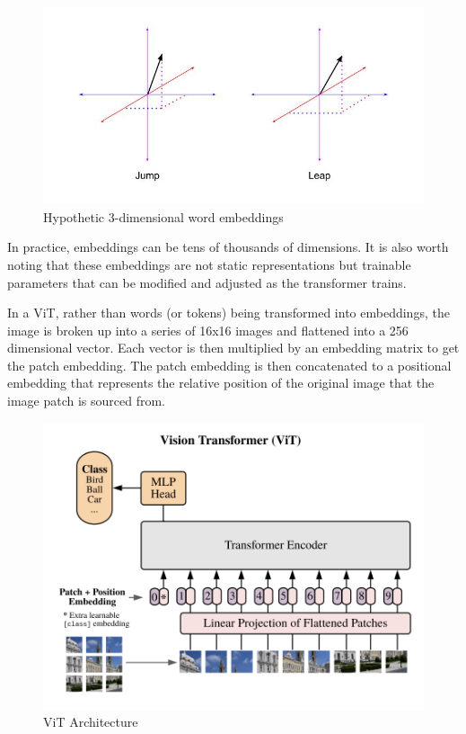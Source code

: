 \documentclass [MS] {uclathes}
\begin{document}
\begin{figure} [H]
    \centering
    \includegraphics[width=1\linewidth]{figures/Cosine Similarity Example.jpg}
    \caption{Hypothetic 3-dimensional word embeddings}
    \label{fig:hypothetical word embeddings}
\end{figure}

In practice, embeddings can be tens of thousands of dimensions. It is also worth noting that these embeddings are not 
static representations but trainable parameters that can be modified and adjusted as the transformer trains. 

In a ViT, rather than words (or tokens) being transformed into embeddings, the image is broken up into a series of 16x16
images and flattened into a 256 dimensional vector. Each vector is then multiplied by an embedding matrix to get the 
patch embedding. The patch embedding is then concatenated to a positional embedding that represents the relative 
position of the original image that the image patch is sourced from. 

\begin{figure} [H]
    \centering
    \includegraphics[width=0.75\linewidth]{figures/ViT Architecture.png}
    \caption{ViT Architecture}
    \label{fig:ViT Architecture}
\end{figure}
\end{document}
